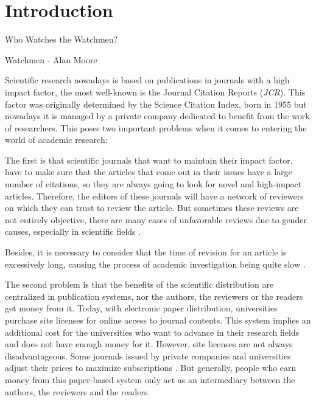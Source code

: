 \chapter{Introduction}

\begin{FraseCelebre}
  \begin{Frase}
    Who Watches the Watchmen?
  \end{Frase}
  \begin{Fuente}
    Watchmen - Alan Moore
  \end{Fuente}
\end{FraseCelebre}

Scientific research nowadays is based on publications in journals with a high
impact factor\cite{doi:10.1001/jama.295.1.90}, the most well-known is the
Journal Citation Reports (\emph{JCR}). This factor was originally determined by
the Science Citation Index, born in 1955\cite{garfield2007evolution} but
nowadays it is managed by a private company dedicated to benefit from the work
of researchers\cite{toledo2011book}. This poses two important problems when it
comes to entering the world of academic research:

The first is that scientific journals that want to maintain their impact factor,
have to make sure that the articles that come out in their issues have a large
number of citations, so they are always going to look for novel and high-impact
articles. Therefore, the editors of these journals will have a network of
reviewers on which they can trust to review the article. But sometimes these
reviews are not entirely objective, there are many cases of unfavorable reviews
due to gender causes, especially in scientific fields
\cite{wenneras2001nepotism}.

Besides, it is necessary to consider that the time of revision for an article is
excessively long, causing the process of academic investigation being quite slow
\cite{huisman2017duration}.

The second problem is that the benefits of the scientific distribution are
centralized in publication systems, nor the authors, the reviewers or the
readers get money from it. Today, with electronic paper distribution,
universities purchase site licenses for online access to journal contents. This
system implies an additional cost for the universities who want to advance in
their research fields and does not have enough money for it. However, site
licenses are not always disadvantageous. Some journals issued by private
companies and universities adjust their prices to maximize subscriptions
\cite{bergstrom2004costs}. But generally, people who earn money from this
paper-based system only act as an intermediary between the authors, the
reviewers and the readers.

